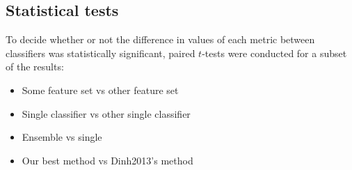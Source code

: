 \subsection{Statistical tests}
To decide whether or not the difference in values of each metric between
classifiers was statistically significant, paired $t$-tests were conducted for
a subset of the results: 
\begin{itemize}
  \item Some feature set vs other feature set
  \item Single classifier vs other single classifier
  \item Ensemble vs single
  \item Our best method vs Dinh2013's method
\end{itemize}
